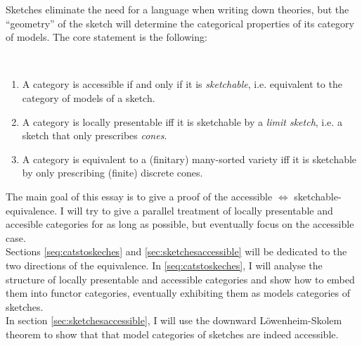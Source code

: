 Sketches eliminate the need for a language when writing down theories, but the ``geometry'' of the sketch will determine the categorical properties of its category of models. The core statement is the following:

\begin{Theorem}[Sketchability]\
\begin{enumerate}
\item A category is accessible if and only if it is \emph{sketchable}, i.e. equivalent to the category of models of a sketch. 

\item A category is locally presentable iff it is sketchable by a \emph{limit sketch}, i.e. a sketch that only prescribes \emph{cones}.

\item A category is equivalent to a (finitary) many-sorted variety iff it is sketchable by only prescribing (finite) discrete cones.
\end{enumerate}
\end{Theorem}

The main goal of this essay is to give a proof of the accessible $\Leftrightarrow$ sketchable-equivalence. I will try to give a parallel treatment of locally presentable and accesible categories for as long as possible, but eventually focus on the accessible case. \\

Sections \ref{seq:catstoskeches} and \ref{sec:sketchesaccessible} will be dedicated to the two directions of the equivalence. In \ref{seq:catstoskeches}, I will analyse the structure of locally presentable and accessible categories and show how to embed them into functor categories, eventually exhibiting them as models categories of sketches. \\

In section \ref{sec:sketchesaccessible}, I will use the downward Löwenheim-Skolem theorem to show that that model categories of sketches are indeed accessible.